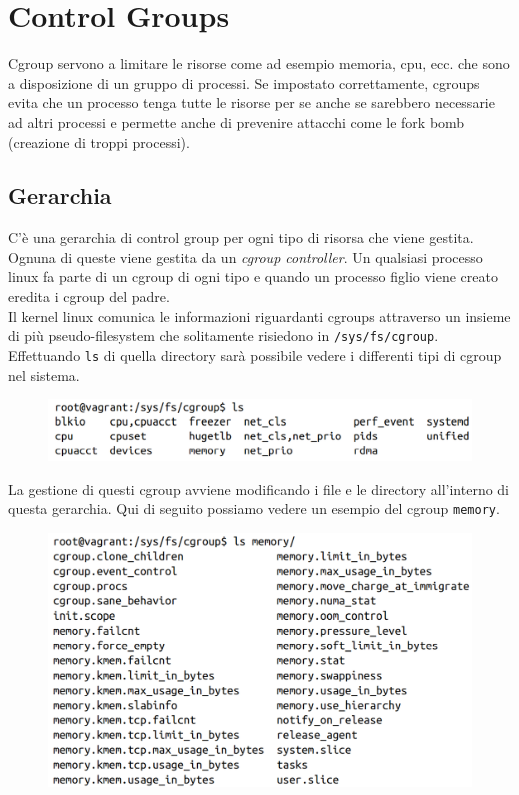\chapter{Control Groups}

Cgroup servono a limitare le risorse come ad esempio memoria, cpu, ecc. che sono
a disposizione di un gruppo di processi. Se impostato correttamente, cgroups
evita che un processo tenga tutte le risorse per se anche se sarebbero necessarie
ad altri processi e permette anche di prevenire attacchi come le fork bomb
(creazione di troppi processi).

\section{Gerarchia}

C'è una gerarchia di control group per ogni tipo di risorsa che viene gestita.
Ognuna di queste viene gestita da un \textit{cgroup controller}.
Un qualsiasi processo linux fa parte di un cgroup di ogni tipo e quando un
processo figlio viene creato eredita i cgroup del padre.\\

Il kernel linux comunica le informazioni riguardanti cgroups attraverso un insieme
di più pseudo-filesystem che solitamente risiedono in \verb|/sys/fs/cgroup|.
Effettuando \verb|ls| di quella directory sarà possibile vedere i differenti
tipi di cgroup nel sistema.

\begin{figure}[H]
    \centering
    \includegraphics[width=\textwidth, keepaspectratio]{capitoli/os_security/imgs/cgroup1.png}
\end{figure}

La gestione di questi cgroup avviene modificando i file e le directory all'interno
di questa gerarchia. Qui di seguito possiamo vedere un esempio
del cgroup \verb|memory|.

\begin{figure}[H]
    \centering
    \includegraphics[width=\textwidth, keepaspectratio]{capitoli/os_security/imgs/cgroup2.png}
\end{figure}

